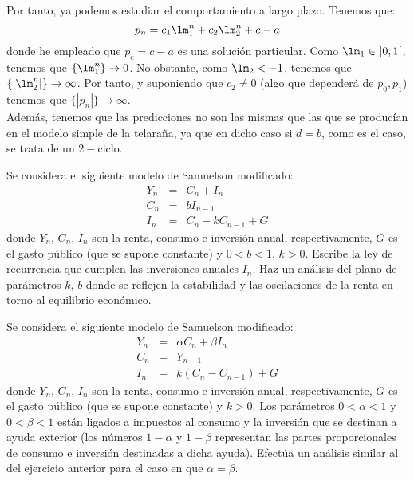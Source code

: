 \begin{ejercicio}
\begin{enumerate}
        Por tanto, ya podemos estudiar el comportamiento a largo plazo. Tenemos que:
        \begin{equation*}
            p_n = c_1 \lm_1^n + c_2\lm_2^n + c-a
        \end{equation*}
        donde he empleado que $p_e=c-a$ es una solución particular. Como $\lm_1\in~]0,1[$, tenemos que $\{\lm_1^n\}\to 0$. No obstante, como $\lm_2<-1$, tenemos que $\{|\lm_2^n|\}\to \infty$.
        Por tanto, y suponiendo que $c_2\neq 0$ (algo que dependerá de $p_0,p_1$) tenemos que $\{|p_n|\}\to \infty$.\\

        Además, tenemos que las predicciones no son las mismas que las que se producían en el modelo simple de la telaraña, ya que en dicho caso si $d=b$, como es el caso, se trata de un $2-$ciclo.
    \end{enumerate}
\end{ejercicio}

\begin{ejercicio}
    Se considera el siguiente modelo de Samuelson modificado:
    \begin{equation*}
        \begin{array}{rcl}
            Y_n & = & C_n + I_n\\
            C_n & = & b I_{n-1}\\
            I_n & = & C_n - k C_{n-1} + G
        \end{array}
    \end{equation*}
    donde $Y_n$, $C_n$, $I_n$ son la renta, consumo e inversión anual, respectivamente, $G$ es el gasto público (que se supone
    constante) y $0 < b < 1$, $k > 0$. Escribe la ley de recurrencia que cumplen las inversiones anuales $I_n$. Haz un análisis
    del plano de parámetros $k$, $b$ donde se reflejen la estabilidad y las oscilaciones de la renta en torno al equilibrio
    económico.
\end{ejercicio}

\begin{ejercicio}
    Se considera el siguiente modelo de Samuelson modificado:
    \begin{equation*}
        \begin{array}{rcl}
            Y_n & = & \alpha C_n + \beta I_n\\
            C_n & = & Y_{n-1}\\
            I_n & = & k(C_n - C_{n-1}) + G
        \end{array}
    \end{equation*}
    donde $Y_n$, $C_n$, $I_n$ son la renta, consumo e inversión anual, respectivamente, $G$ es el gasto público (que se supone
    constante) y $k > 0$. Los parámetros $0 < \alpha < 1$ y $0 < \beta < 1$ están ligados a impuestos al consumo y la inversión
    que se destinan a ayuda exterior (los números $1 - \alpha$ y $1 - \beta$ representan las partes proporcionales de consumo e
    inversión destinadas a dicha ayuda). Efectúa un análisis similar al del ejercicio anterior para el caso en que $\alpha = \beta$.
\end{ejercicio}

